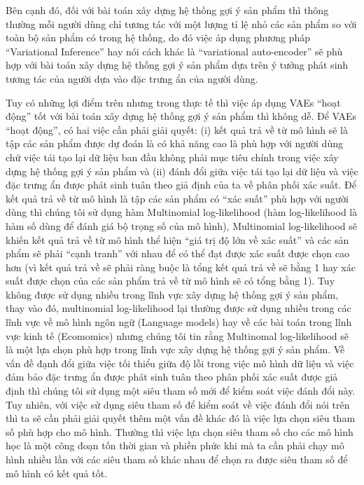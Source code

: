 Bên cạnh đó, đối với bài toán xây dựng hệ thống gợi ý sản phẩm thì thông thường mỗi người dùng chỉ tương tác với một lượng tỉ lệ nhỏ các sản phẩm so với toàn bộ sản phẩm có trong hệ thống, do đó việc áp dụng phương pháp ``Variational Inference'' hay nói cách khác là ``variational auto-encoder'' sẽ phù hợp với bài toán xây dựng hệ thống gợi ý sản phẩm dựa trên ý tưởng phát sinh tương tác của người dựa vào đặc trưng ẩn của người dùng. 

Tuy có những lợi điểm trên nhưng trong thực tế thì việc áp dụng VAEs ``hoạt động'' tốt với bài toán xây dựng hệ thống gợi ý sản phẩm thì không dễ.
Để VAEs ``hoạt động'', có hai việc cần phải giải quyết: (i) kết quả trả về từ mô hình sẽ là tập các sản phẩm được dự đoán là có khả năng cao là phù hợp với người dùng chứ việc tái tạo lại dữ liệu ban đầu không phải mục tiêu chính trong việc xây dựng hệ thống gợi ý sản phẩm và (ii) đánh đổi giữa việc tái tạo lại dữ liệu và việc đặc trưng ẩn được phát sinh tuân theo giả định của ta về phân phối xác suất.
Để kết quả trả về từ mô hình là tập các sản phẩm có ``xác suất'' phù hợp với người dùng thì chúng tôi sử dụng hàm Multinomial log-likelihood (hàm log-likelihood là hàm số dùng để đánh giá bộ trọng số của mô hình), Multinomial log-likelihood sẽ khiến kết quả trả về từ mô hình thể hiện ``giá trị độ lớn về xác suất'' và các sản phẩm sẽ phải ``cạnh tranh'' với nhau để có thể đạt được xác suất được chọn cao hơn (vì kết quả trả về sẽ phải ràng buộc là tổng kết quả trả về sẽ bằng 1 hay xác suất được chọn của các sản phẩm trả về từ mô hình sẽ có tổng bằng 1).
Tuy không được sử dụng nhiều trong lĩnh vực xây dựng hệ thống gợi ý sản phẩm, thay vào đó, multinomial log-likelihood lại thường được sử dụng nhiều trong các lĩnh vực về mô hình ngôn ngữ (Language models) hay về các bài toán trong lĩnh vực kinh tế (Ecomomics) nhưng chúng tôi tin rằng Multinomal log-likelihood sẽ là một lựa chọn phù hợp trong lĩnh vực xây dựng hệ thống gợi ý sản phẩm.
Về vấn đề đạnh đổi giữa việc tối thiểu giữa độ lỗi trong việc mô hình dữ liệu và việc đảm bảo đặc trưng ẩn được phát sinh tuân theo phân phối xác suất được giả định thì chúng tôi sử dụng một siêu tham số mới để kiểm soát việc đánh đổi này.
Tuy nhiên, với việc sử dụng siêu tham số để kiểm soát về việc đánh đổi nói trên thì ta sẽ cần phải giải quyết thêm một vấn đề khác đó là việc lựa chọn siêu tham số phù hợp cho mô hình.
Thường thì việc lựa chọn siêu tham số cho các mô hình học là một công đoạn tốn thời gian và phiền phức khi mà ta cần phải chạy mô hình nhiều lần với các siêu tham số khác nhau để chọn ra được siêu tham số để mô hình có kết quả tốt.
